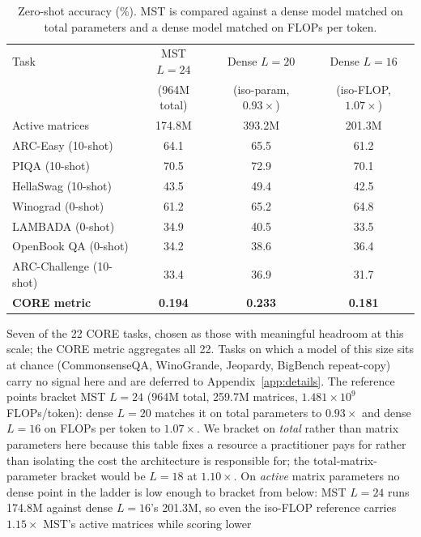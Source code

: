 \documentclass{article}
\begin{document}
\begin{table}[t]
\caption{Zero-shot accuracy (\%). MST is compared against a dense model matched on
total parameters and a dense model matched on FLOPs per token.}
\label{tab:downstream}
\begin{center}
\begin{small}
\begin{tabular}{lccc}
\toprule
Task & MST $L{=}24$ & Dense $L{=}20$ & Dense $L{=}16$ \\
     & (964M total) & (iso-param, $0.93\times$) & (iso-FLOP, $1.07\times$) \\
Active matrices & 174.8M & 393.2M & 201.3M \\
\midrule
ARC-Easy (10-shot)      & 64.1 & 65.5 & 61.2 \\
PIQA (10-shot)          & 70.5 & 72.9 & 70.1 \\
HellaSwag (10-shot)     & 43.5 & 49.4 & 42.5 \\
Winograd (0-shot)       & 61.2 & 65.2 & 64.8 \\
LAMBADA (0-shot)        & 34.9 & 40.5 & 33.5 \\
OpenBook QA (0-shot)    & 34.2 & 38.6 & 36.4 \\
ARC-Challenge (10-shot) & 33.4 & 36.9 & 31.7 \\
\midrule
\textbf{CORE metric}    & \textbf{0.194} & \textbf{0.233} & \textbf{0.181} \\
\bottomrule
\end{tabular}
\end{small}
\end{center}
Seven of the 22 CORE tasks, chosen as those with meaningful headroom at this
scale; the CORE metric aggregates all 22. Tasks on which a model of this size
sits at chance (CommonsenseQA, WinoGrande, Jeopardy, BigBench repeat-copy) carry
no signal here and are deferred to Appendix~\ref{app:details}.
The reference points bracket MST $L{=}24$ (964M total, 259.7M matrices,
$1.481\!\times\!10^{9}$ FLOPs/token): dense $L{=}20$ matches it on total parameters
to $0.93\times$ and dense $L{=}16$ on FLOPs per token to $1.07\times$. We bracket on
\emph{total} rather than matrix parameters here because this table fixes a resource
a practitioner pays for rather than isolating the cost the architecture is
responsible for; the total-matrix-parameter bracket would be $L{=}18$ at $1.10\times$.
On \emph{active} matrix parameters no dense point in the ladder is low enough to
bracket from below: MST $L{=}24$ runs 174.8M against dense $L{=}16$'s 201.3M, so even
the iso-FLOP reference carries $1.15\times$ MST's active matrices while scoring lower

\end{table}
\end{document}
